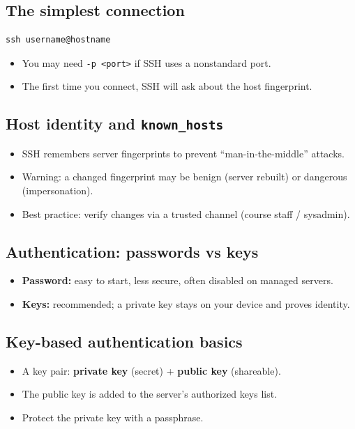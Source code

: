 \subsection{The simplest connection}
\begin{verbatim}
ssh username@hostname
\end{verbatim}
\begin{itemize}
\item You may need \texttt{-p <port>} if SSH uses a nonstandard port.
\item The first time you connect, SSH will ask about the host fingerprint.
\end{itemize}

\subsection{Host identity and \texttt{known\_hosts}}
\begin{itemize}
\item SSH remembers server fingerprints to prevent ``man-in-the-middle'' attacks.
\item Warning: a changed fingerprint may be benign (server rebuilt) or dangerous (impersonation).
\item Best practice: verify changes via a trusted channel (course staff / sysadmin).
\end{itemize}

\subsection{Authentication: passwords vs keys}
\begin{itemize}
\item \textbf{Password:} easy to start, less secure, often disabled on managed servers.
\item \textbf{Keys:} recommended; a private key stays on your device and proves identity.
\end{itemize}

\subsection{Key-based authentication basics}
\begin{itemize}
\item A key pair: \textbf{private key} (secret) + \textbf{public key} (shareable).
\item The public key is added to the server's authorized keys list.
\item Protect the private key with a passphrase.
\end{itemize}

